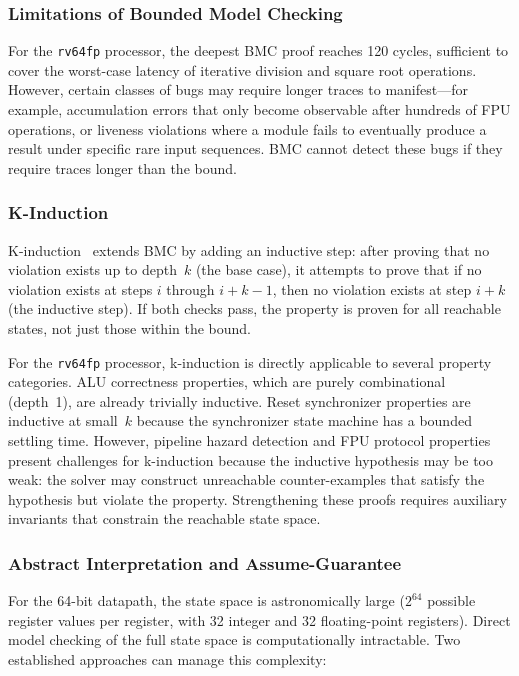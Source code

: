 \documentclass[journal]{IEEEtran}
\begin{document}
\subsubsection{Limitations of Bounded Model Checking}
For the \texttt{rv64fp} processor, the deepest BMC proof reaches 120
cycles, sufficient to cover the worst-case latency of iterative
division and square root operations.  However, certain classes of bugs
may require longer traces to manifest---for example, accumulation errors
that only become observable after hundreds of FPU operations, or liveness
violations where a module fails to eventually produce a result under
specific rare input sequences.  BMC cannot detect these bugs if they
require traces longer than the bound.

\subsubsection{K-Induction}
K-induction~\cite{sheeran2000kinduction} extends BMC by adding an
inductive step: after proving that no violation exists up to depth~$k$
(the base case), it attempts to prove that if no violation exists at
steps $i$ through $i+k-1$, then no violation exists at step $i+k$ (the
inductive step).  If both checks pass, the property is proven for all
reachable states, not just those within the bound.

For the \texttt{rv64fp} processor, k-induction is directly applicable to
several property categories.  ALU correctness properties, which are
purely combinational (depth~1), are already trivially inductive.  Reset
synchronizer properties are inductive at small~$k$ because the
synchronizer state machine has a bounded settling time.  However,
pipeline hazard detection and FPU protocol properties present challenges
for k-induction because the inductive hypothesis may be too weak: the
solver may construct unreachable counter-examples that satisfy the
hypothesis but violate the property.  Strengthening these proofs
requires auxiliary invariants that constrain the reachable state space.

\subsubsection{Abstract Interpretation and Assume-Guarantee}
For the 64-bit datapath, the state space is astronomically large
($2^{64}$ possible register values per register, with 32 integer and 32
floating-point registers).  Direct model checking of the full state space
is computationally intractable.  Two established approaches can manage
this complexity:
\end{document}
